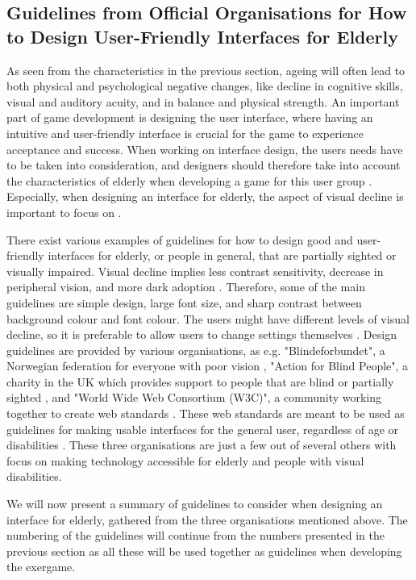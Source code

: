 \begin{enumerate}[{g}.1]
\section{Guidelines from Official Organisations for How to Design User-Friendly Interfaces for Elderly}
\label{sec:designelderly}

As seen from the characteristics in the previous section, ageing will often lead to both physical and psychological negative changes, like decline in cognitive skills, visual and auditory acuity, and in balance and physical strength. An important part of game development is designing the user interface, where having an intuitive and user-friendly interface is crucial for the game to experience acceptance and success.  When working on interface design, the users needs have to be taken into consideration, and designers should therefore take into account the characteristics of elderly when developing a game for this user group \cite{mmi}. Especially, when designing an interface for elderly, the aspect of visual decline is important to focus on \cite{blindeforbundetTekst}. 

There exist various examples of guidelines for how to design good and user-friendly interfaces for elderly, or people in general, that are partially sighted or visually impaired. Visual decline implies less contrast sensitivity, decrease in peripheral vision, and more dark adoption \cite{ijsselsteijn2007digital}. Therefore, some of the main guidelines are simple design, large font size, and sharp contrast between background colour and font colour. The users might have different levels of visual decline, so it is preferable to allow users to change settings themselves \cite{blindeforbundetTekst} \cite{actionforblindpeopleTekst} \cite{w3cTekst}. Design guidelines are provided by various organisations, as e.g. "Blindeforbundet", a Norwegian federation for everyone with poor vision \cite{blindeforbundet}, "Action for Blind People", a charity in the UK which provides support to people that are blind or partially sighted \cite{actionforblindpeople}, and "World Wide Web Consortium (W3C)", a community working together to create web standards \cite{w3c}. These web standards are meant to be used as guidelines for making usable interfaces for the general user, regardless of age or disabilities \cite{w3cTekst}. These three organisations are just a few out of several others with focus on making technology accessible for elderly and people with visual disabilities. 

We will now present a summary of guidelines to consider when designing an interface for elderly, gathered from the three organisations mentioned above. The numbering of the guidelines will continue from the numbers presented in the previous section as all these will be used together as guidelines when developing the exergame.



\end{enumerate}
